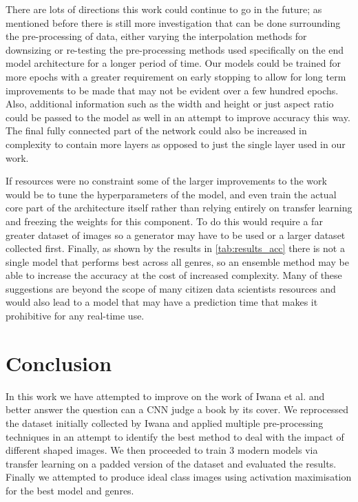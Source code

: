 \documentclass[12pt]{article}
\numberwithin{equation}{section}
\numberwithin{figure}{section}
\begin{document}
There are lots of directions this work could continue to go in the future; as mentioned before there is still more investigation that can be done surrounding the pre-processing of data, either varying the interpolation methods for downsizing or re-testing the pre-processing methods used specifically on the end model architecture for a longer period of time. Our models could be trained for more epochs with a greater requirement on early stopping to allow for long term improvements to be made that may not be evident over a few hundred epochs. Also, additional information such as the width and height or just aspect ratio could be passed to the model as well in an attempt to improve accuracy this way. The final fully connected part of the network could also be increased in complexity to contain more layers as opposed to just the single layer used in our work.

If resources were no constraint some of the larger improvements to the work would be to tune the hyperparameters of the model, and even train the actual core part of the architecture itself rather than relying entirely on transfer learning and freezing the weights for this component. To do this would require a far greater dataset of images so a generator may have to be used or a larger dataset collected first. Finally, as shown by the results in \cref{tab:results_acc} there is not a single model that performs best across all genres, so an ensemble method may be able to increase the accuracy at the cost of increased complexity. Many of these suggestions are beyond the scope of many citizen data scientists resources and would also lead to a model that may have a prediction time that makes it prohibitive for any real-time use.

\section{Conclusion} 
\label{sec:Conclusion} 
In this work we have attempted to improve on the work of Iwana et al. and better answer the question can a CNN judge a book by its cover. We reprocessed the dataset initially collected by Iwana and applied multiple pre-processing techniques in an attempt to identify the best method to deal with the impact of different shaped images. We then proceeded to train 3 modern models via transfer learning on a padded version of the dataset and evaluated the results. Finally we attempted to produce ideal class images using activation maximisation for the best model and genres.
\end{document}
